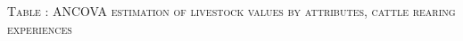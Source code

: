 \vspace{-1cm}\hspace{-1cm}\begin{minipage}[t]{14cm}
\hfil\textsc{\normalsize Table \thetable: ANCOVA estimation of livestock values by attributes, cattle rearing experiences\label{tab ANCOVA livestock values Experience attributes}}\\
\setlength{\tabcolsep}{1pt}
\setlength{\baselineskip}{8pt}
\renewcommand{\arraystretch}{.52}
\hfil{}\\
\end{minipage}

